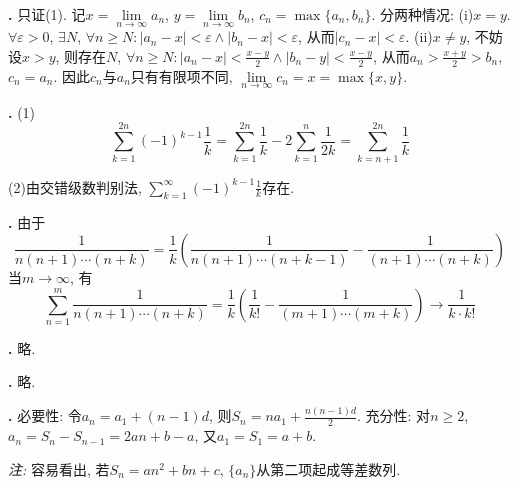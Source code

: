 \par \textbf{\thesolseq .} 只证(1). 记$x=\lim\limits_{n\to \infty} a_n$, $y=\lim\limits_{n\to \infty} b_n$, $c_n=\max \{a_n, b_n\}$. 分两种情况: (i)$x=y$. $\forall \varepsilon>0$, $\exists N$, $\forall n\ge N: |a_n-x|<\varepsilon \land |b_n-x|<\varepsilon$, 从而$|c_n-x|<\varepsilon$. (ii)$x\neq y$, 不妨设$x>y$, 则存在$N$, $\forall n\ge N: |a_n-x|<\frac{x-y}{2} \land |b_n-y|<\frac{x-y}{2}$, 从而$a_n > \frac{x+y}{2} > b_n$, $c_n=a_n$. 因此$c_n$与$a_n$只有有限项不同, $\lim\limits_{n\to \infty} c_n=x=\max \{x,y\}$.

\par \textbf{\thesolseq .} (1) \begin{equation}
\sum_{k=1}^{2n} (-1)^{k-1} \frac{1}{k}=\sum_{k=1}^{2n}\frac{1}{k} -2\sum_{k=1}^{n}\frac{1}{2k} = \sum_{k=n+1}^{2n}\frac{1}{k}
\end{equation}
\par (2)由交错级数判别法, $\sum_{k=1}^{\infty} (-1)^{k-1} \frac{1}{k}$存在. 

\par \textbf{\thesolseq .} 由于
\begin{equation}
    \frac{1}{n(n+1)\cdots (n+k)}=\frac{1}{k}\left(\frac{1}{n(n+1)\cdots (n+k-1)}-\frac{1}{(n+1)\cdots (n+k)}\right)
\end{equation}
当$m\to \infty$, 有
\begin{equation}
    \sum_{n=1}^m \frac{1}{n(n+1)\cdots (n+k)}=\frac{1}{k}\left(\frac{1}{k!}-\frac{1}{(m+1)\cdots (m+k)}\right) \to \frac{1}{k\cdot k!}
\end{equation}

\par \textbf{\thesolseq .} 略. 

\par \textbf{\thesolseq .} 略. 



\par \textbf{\thesolseq .} 必要性: 令$a_n=a_1+(n-1)d$, 则$S_n=na_1+\frac{n(n-1)d}{2}$. 充分性: 对$n\ge 2$, $a_n=S_n-S_{n-1}=2an+b-a$, 又$a_1=S_1=a+b$.  
\par \emph{注:} 容易看出, 若$S_n=an^2+bn+c$, $\{a_n\}$从第二项起成等差数列. 

